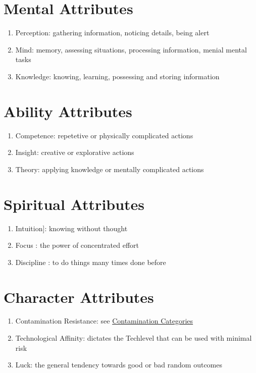 \section{Mental Attributes}\label{sec:mental-attributes}
\begin{enumerate}[label=-]
    \item {Perception}: gathering information, noticing details, being alert
    \item {Mind}: memory, assessing situations, processing information, menial mental tasks
    \item {Knowledge}: knowing, learning, possessing and storing information
\end{enumerate}
\section{Ability Attributes}\label{sec:ability-attributes}
\begin{enumerate}[label= -]
    \item {Competence}: repetetive or physically complicated actions
    \item {Insight}: creative or explorative actions
    \item {Theory}: applying knowledge or mentally complicated actions
\end{enumerate}
\section{Spiritual Attributes}\label{sec:spiritual-attributes}
\begin{enumerate}[label= -]
    \item {Intuition}\label{itm:intuition}]: knowing without thought
    \item {Focus} \label{itm:focus}: the power of concentrated effort
    \item {Discipline} \label{itm:discipline}: to do things many times done before
\end{enumerate}
\section{Character Attributes}\label{sec:character-attributes}
\begin{enumerate}[label= -]
    \item {Contamination Resistance}: see \hyperref[subsec:categories]{Contamination Categories}
    \item {Technological Affinity}: dictates the Techlevel that can be used with minimal risk
    \item {Luck}: the general tendency towards good or bad random outcomes
\end{enumerate}
